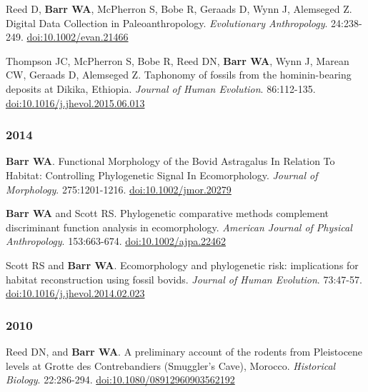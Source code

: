 \begin{etaremune}
\item  Reed D, {\bfseries Barr WA}, McPherron S, Bobe R, Geraads D, Wynn J, Alemseged Z. Digital Data Collection in Paleoanthropology. \emph{Evolutionary Anthropology}. 24:238-249. \href{http://dx.doi.org/10.1002/evan.21466}{doi:10.1002/evan.21466}

\item  Thompson JC, McPherron S, Bobe R, Reed DN, {\bfseries Barr WA}, Wynn J, Marean CW, Geraads D, Alemseged Z. Taphonomy of fossils from the hominin-bearing deposits at Dikika, Ethiopia. \emph{Journal of Human Evolution}. 86:112-135. \href{http://dx.doi.org/10.1016/j.jhevol.2015.06.013}{doi:10.1016/j.jhevol.2015.06.013}

\subsubsection*{2014}

\item  {\bfseries Barr WA}. Functional Morphology of the Bovid Astragalus In Relation To Habitat: Controlling Phylogenetic Signal In Ecomorphology. \emph{Journal of Morphology}. 275:1201-1216. \href{http://dx.doi.org/10.1002/jmor.20279}{doi:10.1002/jmor.20279}

\item  {\bfseries Barr WA} and Scott RS. Phylogenetic comparative methods complement discriminant function analysis in ecomorphology. \emph{American Journal of Physical Anthropology}. 153:663-674. \href{http://dx.doi.org/10.1002/ajpa.22462}{doi:10.1002/ajpa.22462}

\item  Scott RS and {\bfseries Barr WA}. Ecomorphology and phylogenetic risk: implications for habitat reconstruction using fossil bovids. \emph{Journal of Human Evolution}. 73:47-57. \href{http://dx.doi.org/10.1016/j.jhevol.2014.02.023}{doi:10.1016/j.jhevol.2014.02.023}

\subsubsection*{2010}

\item  Reed DN, and {\bfseries Barr WA}. A preliminary account of the rodents from Pleistocene levels at Grotte des Contrebandiers (Smuggler's Cave), Morocco. \emph{Historical Biology}. 22:286-294. \href{http://dx.doi.org/10.1080/08912960903562192}{doi:10.1080/08912960903562192}


\end{etaremune}


